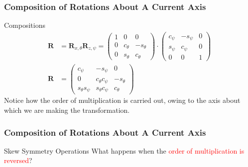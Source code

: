 \begin{frame}
	\frametitle{Composition of Rotations About A Current Axis}
	\begin{block}{Compositions}
		\begin{align}
			\bm{R} &= \bm{R}_{x, \theta} \bm{R}_{z, \psi} 
			= \left(\begin{array}{ccc}
				1 & 0 & 0 \\
				0 & c_\theta & -s_\theta \\
				0 & s_\theta & c_\theta
			\end{array}\right) 
			\cdot
			\left(\begin{array}{ccc}
				c_\psi & -s_\psi & 0 \\
				s_\psi & c_\psi & 0 \\
				0 & 0 & 1
			\end{array}\right) \\
			\bm{R} &= \left(\begin{array}{ccc}
				c_\psi & -s_\psi & 0 \\
				0 & c_\theta c_\psi &  -s_\theta \\
				s_\theta s_\psi & s_\theta c_\psi & c_\theta 
			\end{array}\right)
		\end{align}
		\footnotesize{Notice how the order of multiplication is carried out, owing to the axis about which we are making the transformation.} 
	\end{block}
\end{frame} 

\begin{frame}
	\frametitle{Composition of Rotations About A Current Axis}
	\begin{block}{Skew Symmetry Operations}
		What happens when the \textcolor{red}{order of multiplication is reversed}?
	\end{block}
	
\end{frame} 


